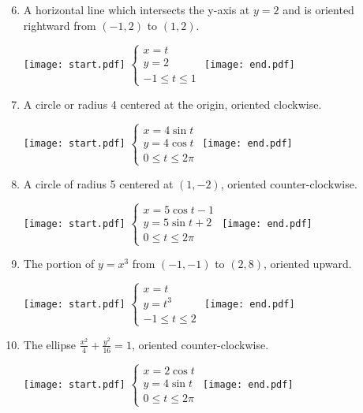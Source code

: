 \documentclass[12pt]{article}
\begin{document}
\begin{enumerate}
\end{enumerate}


\begin{enumerate}
\setcounter{enumi}{5}

\item A horizontal line which intersects the y-axis at $y=2$ and is oriented rightward from $(-1,2)$ to $(1,2)$. 

\texttt{[image: start.pdf]}
{{$\left\{\begin{array}{l}
x=t\\
y=2\\
-1\leq t\leq 1\end{array}\right.$}}
\texttt{[image: end.pdf]}


\item A circle or radius 4 centered at the origin, oriented clockwise.  

\texttt{[image: start.pdf]}
{{$\left\{\begin{array}{l}
x=4\sin{t}\\
y=4\cos{t}\\
0\leq t\leq 2\pi\end{array}\right.$}}
\texttt{[image: end.pdf]}


\item A circle of radius 5 centered at $(1,-2)$, oriented counter-clockwise. 

\texttt{[image: start.pdf]}
{{$\left\{\begin{array}{l}
x=5\cos{t}-1\\
y=5\sin{t}+2\\
0\leq t\leq 2\pi \end{array}\right.$}}
\texttt{[image: end.pdf]}


\item The portion of $y=x^3$ from $(-1,-1)$ to $(2,8)$, oriented upward. 

\texttt{[image: start.pdf]}
{{$\left\{\begin{array}{l}
x=t\\
y=t^3\\
-1\leq t\leq 2\end{array}\right.$}}
\texttt{[image: end.pdf]}


\item The ellipse $\frac{x^2}{4}+\frac{y^2}{16}=1$, oriented counter-clockwise. 

\texttt{[image: start.pdf]}
{{$\left\{\begin{array}{l}
x=2\cos{t}\\
y=4\sin{t}\\
0\leq t\leq 2\pi\end{array}\right.$}}
\texttt{[image: end.pdf]}


\end{enumerate}
\end{document}
